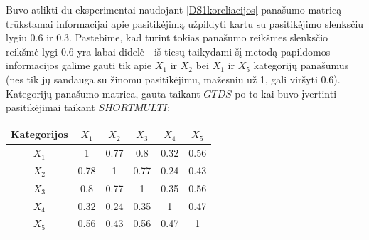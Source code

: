 \documentclass{VUMIFInfMagistrinis}
\begin{document}
\indent
Buvo atlikti du eksperimentai naudojant \ref{DS1koreliacijos} panašumo matricą trūkstamai informacijai apie pasitikėjimą užpildyti kartu su pasitikėjimo slenksčiu lygiu 0.6 ir 0.3. Pastebime, kad turint tokias panašumo reikšmes slenksčio reikšmė lygi 0.6 yra labai didelė - iš tiesų taikydami šį metodą papildomos informacijos galime gauti tik apie $X_1$ ir $X_2$ bei $X_1$ ir $X_5$ kategorijų panašumus (nes tik jų sandauga su žinomu pasitikėjimu, mažesniu už 1, gali viršyti 0.6).
\newline
\indent 
Kategorijų panašumo matrica, gauta taikant $GTDS$ po to kai buvo įvertinti pasitikėjimai taikant $SHORTMULTI$:
\begin{center}
	\begin{tabular}{||c c c c c c||} 
		\hline
		Kategorijos & $X_1$ & $X_2$ & $X_3$ & $X_4$ & $X_5$ \\ [0.5ex] 
		\hline\hline
		$X_1$ & 1 & 0.77 & 0.8 & 0.32 & 0.56 \\ 
		\hline
		$X_2$ & 0.78 & 1 & 0.77 & 0.24 & 0.43 \\
		\hline
		$X_3$ & 0.8 & 0.77 & 1 & 0.35 & 0.56 \\
		\hline
		$X_4$ & 0.32 & 0.24 & 0.35 & 1 & 0.47 \\
		\hline
		$X_5$ & 0.56 & 0.43 & 0.56 & 0.47 & 1 \\
		\hline
	\end{tabular}\label{DS1panasumai}
\end{center}
\end{document}
